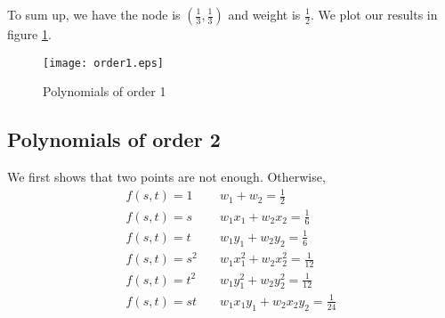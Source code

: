 \documentclass[conference,onecolumn, 12pt]{IEEEtran}
\begin{document}
To sum up, we have the node is $(\frac{1}{3},\frac{1}{3})$ and weight is $\frac{1}{2}$. We plot our results in figure \ref{p1}.
\begin{figure}[!htbp]
    \centering
    \texttt{[image: order1.eps]}
    \caption{Polynomials of order 1}
    \label{p1}
\end{figure}

\subsection{Polynomials of order 2}
We first shows that two points are not enough. Otherwise, 
\begin{subequations}
    \label{twopoints}
    \begin{align}
        f(s,t)=1&\quad w_1+w_2=\frac{1}{2}\\
        f(s,t)=s&\quad w_1x_1+w_2x_2=\frac{1}{6}\\
        f(s,t)=t&\quad w_1y_1+w_2y_2=\frac{1}{6}\\
        f(s,t)=s^2&\quad w_1x_1^2+w_2x_2^2=\frac{1}{12}\\
        f(s,t)=t^2&\quad w_1y_1^2+w_2y_2^2=\frac{1}{12}\\
        f(s,t)=st&\quad w_1x_1y_1+w_2x_2y_2=\frac{1}{24}
    \end{align}
\end{subequations}
\end{document}
